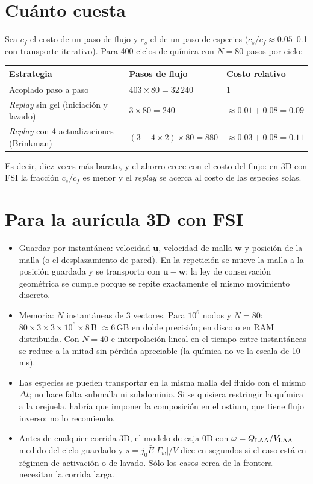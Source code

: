 \documentclass[11pt,a4paper]{article}
\newcommand{\bu}{\bm{u}}
\begin{document}
\section{Cuánto cuesta}

Sea $c_f$ el costo de un paso de flujo y $c_s$ el de un paso de especies ($c_s/c_f\approx0.05$--0.1 con transporte iterativo). Para 400 ciclos de química con $N=80$ pasos por ciclo:
\begin{center}\small
\begin{tabular}{@{}lll@{}}
\toprule
Estrategia & Pasos de flujo & Costo relativo \\
\midrule
Acoplado paso a paso & $403\times80=32\,240$ & $1$ \\
\emph{Replay} sin gel (iniciación y lavado) & $3\times80=240$ & $\approx0.01+0.08=0.09$ \\
\emph{Replay} con 4 actualizaciones (Brinkman) & $(3+4\times2)\times80=880$ & $\approx0.03+0.08=0.11$ \\
\bottomrule
\end{tabular}
\end{center}
Es decir, diez veces más barato, y el ahorro crece con el costo del flujo: en 3D con FSI la fracción $c_s/c_f$ es menor y el \emph{replay} se acerca al costo de las especies solas.

\section{Para la aurícula 3D con FSI}

\begin{itemize}[leftmargin=1.4em]
\item Guardar por instantánea: velocidad $\bu$, velocidad de malla $\bm w$ y posición de la malla (o el desplazamiento de pared). En la repetición se mueve la malla a la posición guardada y se transporta con $\bu-\bm w$: la ley de conservación geométrica se cumple porque se repite exactamente el mismo movimiento discreto.
\item Memoria: $N$ instantáneas de 3 vectores. Para $10^6$ nodos y $N=80$: $80\times3\times3\times10^6\times8\,$B $\approx6\,$GB en doble precisión; en disco o en RAM distribuida. Con $N=40$ e interpolación lineal en el tiempo entre instantáneas se reduce a la mitad sin pérdida apreciable (la química no ve la escala de 10\,ms).
\item Las especies se pueden transportar en la misma malla del fluido con el mismo $\Delta t$; no hace falta submalla ni subdominio. Si se quisiera restringir la química a la orejuela, habría que imponer la composición en el ostium, que tiene flujo inverso: no lo recomiendo.
\item Antes de cualquier corrida 3D, el modelo de caja 0D con $\omega=Q_{\rm LAA}/V_{\rm LAA}$ medido del ciclo guardado y $s=j_0\bar E|\Gamma_w|/V$ dice en segundos si el caso está en régimen de activación o de lavado. Sólo los casos cerca de la frontera necesitan la corrida larga.
\end{itemize}
\end{document}
